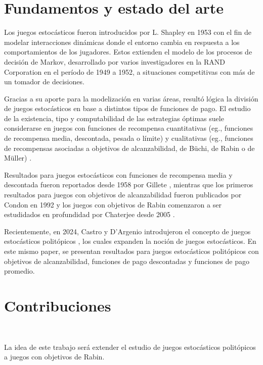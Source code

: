 \section{Fundamentos y estado del arte}

Los juegos estocásticos fueron introducidos por L. Shapley en 1953
\cite{Shapley1953} con el fin de modelar interacciones dinámicas donde el
entorno cambia en respuesta a los comportamientos de los jugadores. Estos
extienden el modelo de los procesos de decisión de Markov, desarrollado por
varios investigadores en la RAND Corporation en el período de 1949 a 1952, a
situaciones competitivas con más de un tomador de decisiones.

Gracias a su aporte para la modelización en varias áreas, resultó lógica la
división de juegos estocásticos en base a distintos tipos de funciones de pago.
El estudio de la existencia, tipo y computabilidad de las estrategias óptimas
suele considerarse en juegos con funciones de recompensa cuantitativas (eg.,
funciones de recompensa media, descontada, pesada o límite) y cualitativas
(eg., funciones de recompensas asociadas a objetivos de alcanzabilidad, de
Büchi, de Rabin o de Müller) \cite{Chatterjee2007,Kučera2011,Chatterjee1}.

Resultados para juegos estocásticos con funciones de recompensa media y
descontada fueron reportados desde 1958 por Gillete \cite{Gillette1958},
mientras que los primeros resultados para juegos con objetivos de
alcanzabilidad fueron publicados por Condon en 1992 \cite{CONDON1992} y los
juegos con objetivos de Rabin comenzaron a ser estudidados en profundidad por
Chaterjee desde 2005 \cite{ComplexityRabin,Chatterjee2007,Chatterjee1}.

Recientemente, en 2024, Castro y D'Argenio introdujeron el concepto de juegos
estocásticos politópicos \cite{Polytopal}, los cuales expanden la noción de
juegos estocásticos.
En este mismo paper, se presentan resultados para juegos estocásticos
politópicos con objetivos de alcanzabilidad, funciones de pago descontadas y
funciones de pago promedio.

\section{Contribuciones}
~\label{cap:intro:sec:contributions}

La idea de este trabajo será extender el estudio de juegos estocásticos
politópicos a juegos con objetivos de Rabin.

